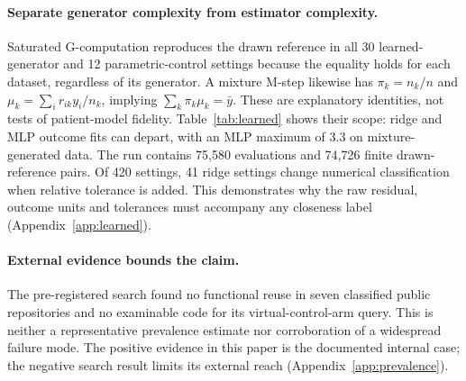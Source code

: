 \paragraph{Separate generator complexity from estimator complexity.}
Saturated G-computation reproduces the drawn reference in all 30 learned-generator
and 12 parametric-control settings because the equality holds for each dataset,
regardless of its generator. A mixture M-step likewise has
$\pi_k=n_k/n$ and $\mu_k=\sum_i r_{ik}y_i/n_k$, implying
$\sum_k\pi_k\mu_k=\bar y$. These are explanatory identities, not tests of
patient-model fidelity. Table~\ref{tab:learned} shows their scope: ridge and MLP
outcome fits can depart, with an MLP maximum of 3.3 on mixture-generated data.
The run contains 75{,}580 evaluations and 74{,}726 finite drawn-reference pairs.
Of 420 settings, 41 ridge settings change numerical classification when
relative tolerance is added. This demonstrates why the raw residual, outcome
units and tolerances must accompany any closeness label
(Appendix~\ref{app:learned}).



\paragraph{External evidence bounds the claim.}
The pre-registered search found no functional reuse in seven classified public
repositories and no examinable code for its virtual-control-arm query.
This is neither a representative prevalence estimate nor corroboration of a
widespread failure mode. The positive evidence in this paper is the documented
internal case; the negative search result limits its external reach
(Appendix~\ref{app:prevalence}).

